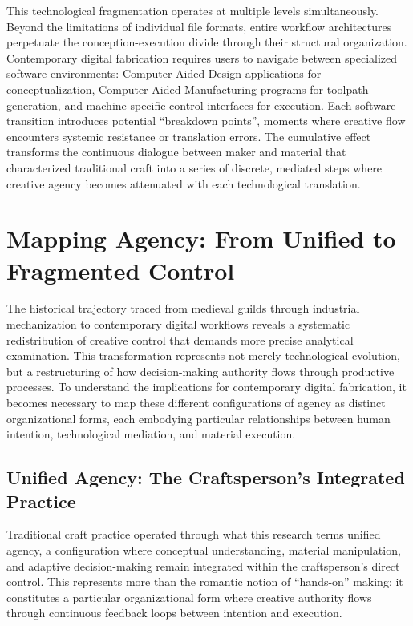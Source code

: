 \vspace{0.5cm}

This technological fragmentation operates at multiple levels simultaneously. Beyond the limitations of individual file formats, entire workflow architectures perpetuate the conception-execution divide through their structural organization. Contemporary digital fabrication requires users to navigate between specialized software environments: Computer Aided Design applications for conceptualization, Computer Aided Manufacturing programs for toolpath generation, and machine-specific control interfaces for execution. Each software transition introduces potential ``breakdown points'', moments where creative flow encounters systemic resistance or translation errors. The cumulative effect transforms the continuous dialogue between maker and material that characterized traditional craft into a series of discrete, mediated steps where creative agency becomes attenuated with each technological translation.

\section{Mapping Agency: From Unified to Fragmented Control}

The historical trajectory traced from medieval guilds through industrial mechanization to contemporary digital workflows reveals a systematic redistribution of creative control that demands more precise analytical examination. This transformation represents not merely technological evolution, but a restructuring of how decision-making authority flows through productive processes. To understand the implications for contemporary digital fabrication, it becomes necessary to map these different configurations of agency as distinct organizational forms, each embodying particular relationships between human intention, technological mediation, and material execution.

\subsection{Unified Agency: The Craftsperson's Integrated Practice}

Traditional craft practice operated through what this research terms unified agency, a configuration where conceptual understanding, material manipulation, and adaptive decision-making remain integrated within the craftsperson's direct control. This represents more than the romantic notion of ``hands-on'' making; it constitutes a particular organizational form where creative authority flows through continuous feedback loops between intention and execution.

